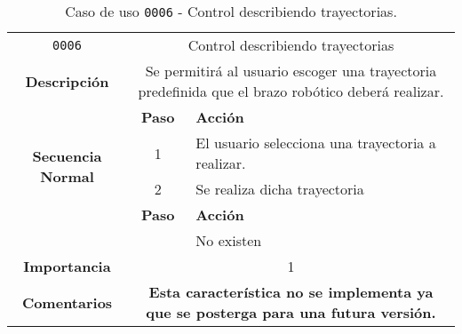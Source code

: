 \begin{table}[H]
    \centering
    \begin{tabularx}{\textwidth}{|c|c|X|}
        \cline{1-3}
        \texttt{0006}        & \multicolumn{2}{c|}{Control describiendo trayectorias}                                      
        \\ \cline{1-3}
        \textbf{Descripción} & \multicolumn{2}{m{13cm}|}{Se permitirá al usuario escoger una trayectoria predefinida que el brazo robótico deberá realizar.}
        \\ \cline{1-3}
        \multirow{4}{*}{\textbf{Secuencia Normal}} & \textbf{Paso} & \textbf{Acción}
        \\ \cline{2-3}                    &   1  & El usuario selecciona una trayectoria a realizar.
        \\ \cline{2-3}                    &   2  & Se realiza dicha trayectoria
        \\ \cline{1-3}
        \multirow{2}{*}{\textbf{Excepciones}} & \textbf{Paso} & \textbf{Acción}
        \\ \cline{2-3}                    &      &  No existen
        \\ \cline{1-3}
        \textbf{Importancia}                 & \multicolumn{2}{c|}{1}           
        \\ \cline{1-3}
        \textbf{Comentarios}                 & \multicolumn{2}{m{13cm}|}{\textbf{Esta característica no se implementa ya que se posterga para una futura versión.}}
        \\ \cline{1-3}
    \end{tabularx}
    \caption{Caso de uso \texttt{0006} - Control describiendo trayectorias.}
    \label{tab:CU0006}
    \label{tab:caso_de_uso_control_describiendo_trayectorias}
\end{table}

